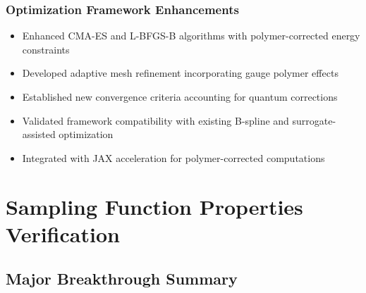 \documentclass[11pt]{article}
\begin{document}
\subsubsection{Optimization Framework Enhancements}
\begin{itemize}
    \item Enhanced CMA-ES and L-BFGS-B algorithms with polymer-corrected energy constraints
    \item Developed adaptive mesh refinement incorporating gauge polymer effects
    \item Established new convergence criteria accounting for quantum corrections
    \item Validated framework compatibility with existing B-spline and surrogate-assisted optimization
    \item Integrated with JAX acceleration for polymer-corrected computations
\end{itemize}

\section{Sampling Function Properties Verification}

\subsection{Major Breakthrough Summary}
\end{document}
